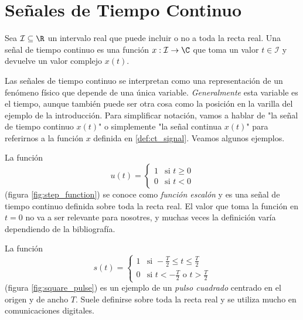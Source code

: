 \section{Señales de Tiempo Continuo}

\begin{definition}
    \label{def:ct_signal}
    Sea $\mathcal{I} \subseteq \R$ un intervalo real que puede incluir o no a toda la recta real. Una señal de tiempo continuo es una función $x : \mathcal{I}  \rightarrow \C$ que toma un valor $t \in \mathcal{I}$ y devuelve un valor complejo $x(t)$. 
\end{definition}

Las señales de tiempo continuo se interpretan como una representación de un fenómeno físico que depende de una única variable. \emph{Generalmente} esta variable es el tiempo, aunque también puede ser otra cosa como la posición en la varilla del ejemplo de la introducción. Para simplificar notación, vamos a hablar de "la señal de tiempo continuo $x(t)$" o simplemente "la señal continua $x(t)$" para referirnos a la función $x$ definida en \ref{def:ct_signal}. Veamos algunos ejemplos.

\begin{example}[Escalón]
    La función 
    \begin{equation*}
        u(t) = \begin{cases}
            1 & \mbox{si } t \geq 0 \\
            0 & \mbox{si } t < 0
        \end{cases}
    \end{equation*}
    (figura \ref{fig:step_function}) se conoce como \emph{función escalón} y es una señal de tiempo continuo definida sobre toda la recta real. El valor que toma la función en $t = 0$ no va a ser relevante para nosotres, y muchas veces la definición varía dependiendo de la bibliografía. 
\end{example}

\begin{example}
    La función 
    \begin{equation*}
        s(t) = \begin{cases}
            1 & \mbox{si } -\frac{T}{2} \leq t \leq \frac{T}{2} \\
            0 & \mbox{si } t < -\frac{T}{2} \mbox{ o } t > \frac{T}{2}
        \end{cases}
    \end{equation*}
    (figura \ref{fig:square_pulse}) es un ejemplo de un \emph{pulso cuadrado} centrado en el origen y de ancho $T$. Suele definirse sobre toda la recta real y se utiliza mucho en comunicaciones digitales. 
\end{example}

